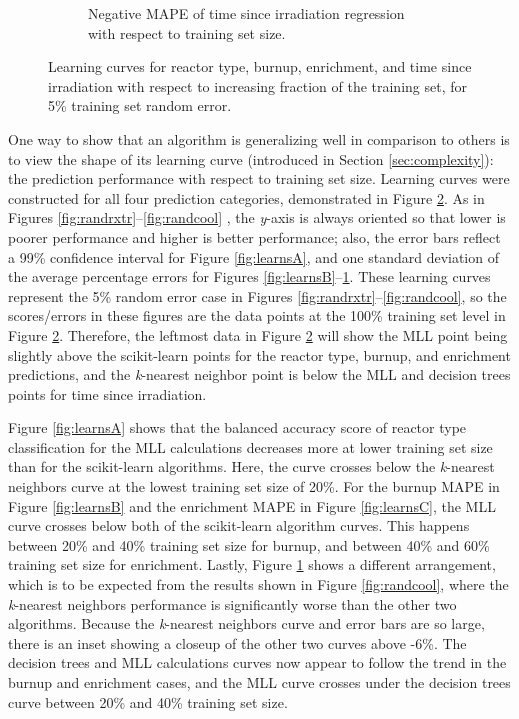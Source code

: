 \begin{figure}[!htb]
\begin{subfigure}[b]{0.50\textwidth}
    \caption{Negative \gls{MAPE} of time since irradiation regression with 
             respect to training set size.}
    \label{fig:learnsD}
  \end{subfigure}
  \caption{Learning curves for reactor type, burnup, enrichment, and time 
           since irradiation with respect to increasing fraction of the 
           training set, for 5\% training set random error.}
  \label{fig:learns}
\end{figure}

One way to show that an algorithm is generalizing well in comparison to others
is to view the shape of its learning curve (introduced in Section
\ref{sec:complexity}): the prediction performance with respect to training set
size.  Learning curves were constructed for all four prediction categories,
demonstrated in Figure \ref{fig:learns}. As in Figures
\ref{fig:randrxtr}--\ref{fig:randcool} , the \textit{y}-axis is always oriented
so that lower is poorer performance and higher is better performance; also, the
error bars reflect a 99\% confidence interval for Figure \ref{fig:learnsA}, and
one standard deviation of the average percentage errors for Figures
\ref{fig:learnsB}--\ref{fig:learnsD}.  These learning curves represent the 5\%
random error case in Figures \ref{fig:randrxtr}--\ref{fig:randcool}, so the
scores/errors in these figures are the data points at the 100\% training set
level in Figure \ref{fig:learns}.  Therefore, the leftmost data in Figure
\ref{fig:learns} will show the \gls{MLL} point being slightly above the
scikit-learn points for the reactor type, burnup, and enrichment predictions,
and the \textit{k}-nearest neighbor point is below the \gls{MLL} and decision
trees points for time since irradiation.  

Figure \ref{fig:learnsA} shows that the balanced accuracy score of reactor type
classification for the \gls{MLL} calculations decreases more at lower training
set size than for the scikit-learn algorithms. Here, the curve crosses below
the \textit{k}-nearest neighbors curve at the lowest training set size of 20\%.
For the burnup \gls{MAPE} in Figure \ref{fig:learnsB} and the enrichment
\gls{MAPE} in Figure \ref{fig:learnsC}, the \gls{MLL} curve crosses below both
of the scikit-learn algorithm curves. This happens between 20\% and 40\%
training set size for burnup, and between 40\% and 60\% training set size for
enrichment.  Lastly, Figure \ref{fig:learnsD} shows a different arrangement,
which is to be expected from the results shown in Figure \ref{fig:randcool},
where the \textit{k}-nearest neighbors performance is significantly worse than
the other two algorithms. Because the \textit{k}-nearest neighbors curve and
error bars are so large, there is an inset showing a closeup of the other two
curves above -6\%.  The decision trees and \gls{MLL} calculations curves now
appear to follow the trend in the burnup and enrichment cases, and the
\gls{MLL} curve crosses under the decision trees curve between 20\% and 40\%
training set size.  

